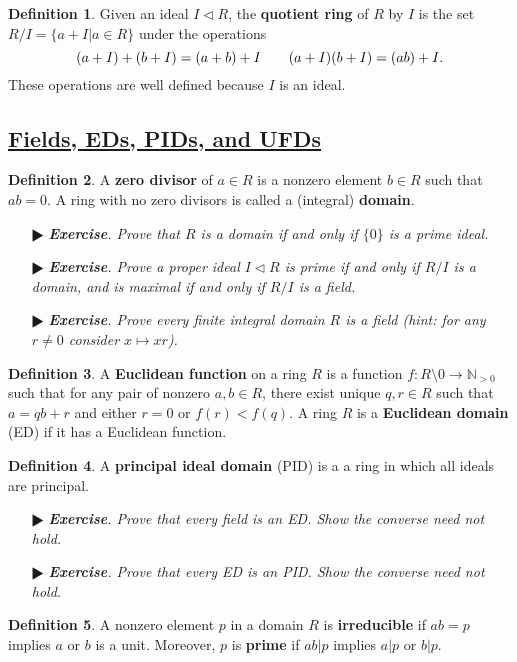 \documentclass[11pt]{amsart}
\theoremstyle{definition}
\newtheorem*{definition*}{Definition}
\renewcommand\:{\colon}
\newcommand{\N}{\mathds{N}}
\newcommand{\1}{\mathds{1}}
\newcommand{\exc}[1]{\vspace{-2.5pt}\begin{itemize}[leftmargin=15pt]\item[$\RHD$] \textit{\textbf{Exercise}. #1}\end{itemize}}
\begin{document}
\begin{definition*}
	Given an ideal $I \triangleleft R$, the \textbf{quotient ring} of $R$ by $I$ is the set $R/I = \{a + I | a \in R\}$ under the operations
		\[ (a + I) + (b + I) = (a + b) + I \hskip20pt (a + I)(b + I) = (ab) + I. \]
	These operations are well defined because $I$ is an ideal.
\end{definition*}

\vskip20pt





\subsection*{\underline{Fields, EDs, PIDs, and UFDs}}

\begin{definition*}
	A \textbf{zero divisor} of $a \in R$ is a nonzero element $b \in R$ such that $ab = 0$. A ring with no zero divisors is called a (integral) \textbf{domain}.
\end{definition*}

\exc{Prove that $R$ is a domain if and only if $\{0\}$ is a prime ideal.}
\exc{Prove a proper ideal $I \triangleleft R$ is prime if and only if $R/I$ is a domain, and is maximal if and only if $R/I$ is a field.}
\exc{Prove every finite integral domain $R$ is a field \textnormal{(}hint: for any $r \neq 0$ consider $x \mapsto xr$\textnormal{)}.}

\begin{definition*}
	A \textbf{Euclidean function} on a ring $R$ is a function $f\: R \setminus 0 \to \N_{>0}$ such that for any pair of nonzero $a, b \in R$, there exist unique $q, r \in R$ such that $a = qb + r$ and either $r = 0$ or $f(r) < f(q)$. A ring $R$ is a \textbf{Euclidean domain} (ED) if it has a Euclidean function.
\end{definition*}

\begin{definition*}
	A \textbf{principal ideal domain} (PID) is a a ring in which all ideals are principal.
\end{definition*}

\exc{Prove that every field is an ED. Show the converse need not hold.}
\exc{Prove that every ED is an PID. Show the converse need not hold.}

\begin{definition*}
	A nonzero element $p$ in a domain $R$ is \textbf{irreducible} if $ab = p$ implies $a$ or $b$ is a unit. Moreover, $p$ is \textbf{prime} if $ab | p$ implies $a|p$ or $b|p$.
\end{definition*}
\end{document}
